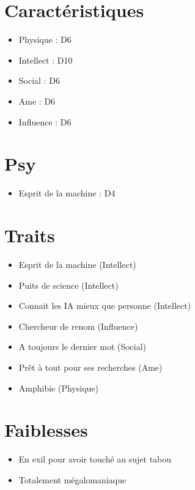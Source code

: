 \begin{multicols}{2}

\section*{Caractéristiques}

\begin{itemize}
\item Physique : D6
\item Intellect : D10
\item Social : D6
\item Ame : D6
\item Influence : D6
\end{itemize}

\section*{Psy}

\begin{itemize}
\item Esprit de la machine : D4
\end{itemize}

\section*{Traits}

\begin{itemize}
\item Esprit de la machine (Intellect)
\item Puits de science (Intellect)
\item Connait les IA mieux que personne (Intellect)
\item Chercheur de renom (Influence)
\item A toujours le dernier mot (Social)
\item Prêt à tout pour ses recherches (Ame)
\item Amphibie (Physique)
\end{itemize}

\section*{Faiblesses}

\begin{itemize}
\item En exil pour avoir touché au sujet tabou
\item Totalement mégalomaniaque
\end{itemize}


\end{multicols}
